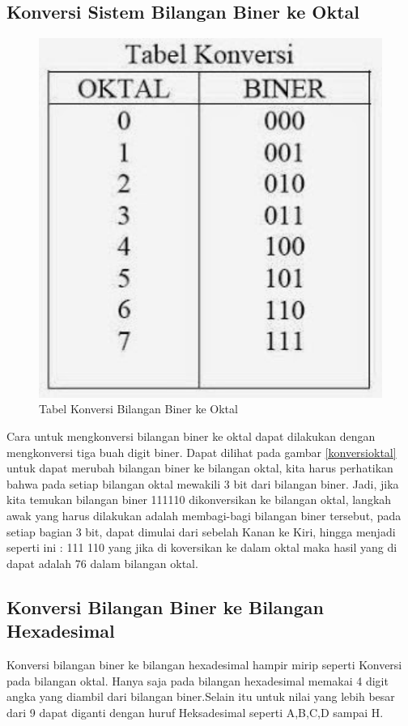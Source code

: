 \subsection{Konversi Sistem Bilangan Biner ke Oktal}
\begin{figure}[ht]
\centerline{\includegraphics[width=1\textwidth]{figures/konversioktal.JPG}}
\caption{Tabel Konversi Bilangan Biner ke Oktal}
\label{Tabel Konversi}
\end{figure}
Cara untuk mengkonversi bilangan biner ke oktal dapat dilakukan dengan mengkonversi tiga buah digit biner. Dapat dilihat pada gambar \ref{konversioktal} untuk dapat merubah bilangan biner ke bilangan oktal, kita harus perhatikan bahwa pada setiap bilangan oktal mewakili 3 bit dari bilangan biner. Jadi, jika kita temukan bilangan biner 111110 dikonversikan ke bilangan oktal, langkah awak yang harus dilakukan adalah membagi-bagi bilangan biner tersebut, pada setiap bagian 3 bit, dapat dimulai dari sebelah Kanan ke Kiri, hingga menjadi seperti ini : 111 110 
yang jika di koversikan ke dalam oktal maka hasil yang di dapat adalah 76 dalam bilangan oktal.

\subsection{Konversi Bilangan Biner ke Bilangan Hexadesimal}
Konversi bilangan biner ke bilangan hexadesimal hampir mirip seperti Konversi pada bilangan oktal. Hanya saja pada bilangan hexadesimal memakai 4 digit angka yang diambil dari bilangan biner.Selain itu untuk nilai yang lebih besar dari 9 dapat diganti dengan huruf Heksadesimal seperti A,B,C,D sampai H. 
